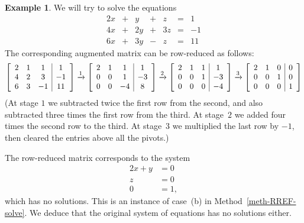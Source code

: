 \documentclass[reqno]{amsart}
\theoremstyle{definition}
\newtheorem{example}[theorem]{Example}
\begin{document}
\begin{example}\label{eg-lineqs-i}
 We will try to solve the equations
 \[
 \begin{array}{rcrcrcr}
 2x & + &  y & + &  z & = &  1  \\
 4x & + & 2y & + & 3z & = & -1  \\
 6x & + & 3y & - &  z & = & 11
 \end{array}
 \]
 The corresponding augmented matrix can be row-reduced as follows:
 \[
 \left[
 \begin{array}{ccc|c}
 2 & 1 & 1 & 1 \\
 4 & 2 & 3 & -1 \\
 6 & 3 & -1 & 11
 \end{array}
 \right] \xrightarrow{1} \left[
 \begin{array}{ccc|c}
 2 & 1 & 1 & 1 \\
 0 & 0 & 1 & -3 \\
 0 & 0 & -4 & 8
 \end{array}
 \right] \xrightarrow{2}
 \left[
 \begin{array}{ccc|c}
 2 & 1 & 1 & 1 \\
 0 & 0 & 1 & -3 \\
 0 & 0 & 0 & -4
 \end{array}
 \right] \xrightarrow{3}
 \left[
 \begin{array}{ccc|c}
 2 & 1 & 0 & 0 \\
 0 & 0 & 1 & 0 \\
 0 & 0 & 0 & 1
 \end{array}
 \right]
 \]
 (At stage $1$ we subtracted twice the first row from the second, and
 also subtracted three times the first row from the third.  At
 stage~$2$ we added four times the second row to the third.  At
 stage~$3$ we multiplied the last row by $-1$, then cleared the
 entries above all the pivots.)

 The row-reduced matrix corresponds to the system
 \begin{align*}
  2x + y &= 0 \\
  z &= 0 \\
  0 &= 1,
 \end{align*}
 which has no solutions.  This is an instance of case~(b) in
 Method~\ref{meth-RREF-solve}.  We deduce that the original system of
 equations has no solutions either.


\end{example}
\end{document}
